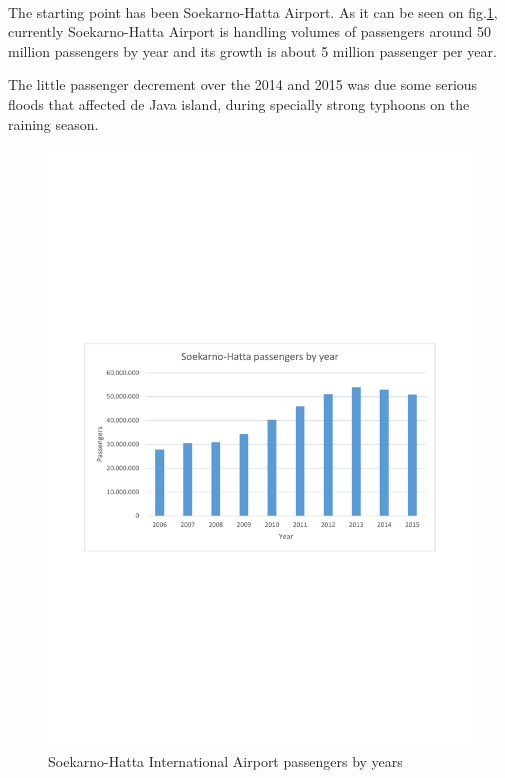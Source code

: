 \paragraph{} The starting point has been Soekarno-Hatta Airport. As it can be seen on fig.\ref{paxYears}, currently Soekarno-Hatta Airport is handling volumes of passengers around 50 million passengers by year and its growth is about 5 million passenger per year.

The little passenger decrement  over the 2014 and 2015 was due some serious floods that affected de Java island, during specially strong  typhoons on the raining season.

\begin{figure}[H]
	\centering
	\includegraphics[clip, trim=2cm 10cm 2cm 10cm, width=1\textwidth]{./images/PROGNOSIS/paxYears}
	\caption{Soekarno-Hatta International Airport passengers by years }
	\label{paxYears}
\end{figure}	

